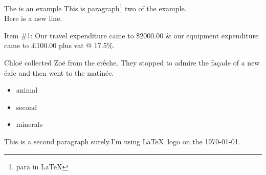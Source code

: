 \documentclass[12pt,parskip=full]{scrartcl}
\begin{document}
The is an example
This is paragraph\footnote{para in \LaTeX} two of the example.\\Here is a new line.

Item \#1: Our travel expenditure came to \$2000.00 \& our equipment expenditure came to \pounds100.00 plus vat @ 17.5\%.


Chlo\"{e} collected Zo\"{e} from the cr\^{e}che. They stopped to admire the fa\c{c}ade of a new \'{cafe} and then went to the matin\'{e}e.
\begin{itemize}
\item animal
\item[\ddag] second
\item minerals
\end{itemize}

This is a second paragraph surely.I'm using \LaTeX\ logo on the \today.
\end{document}
